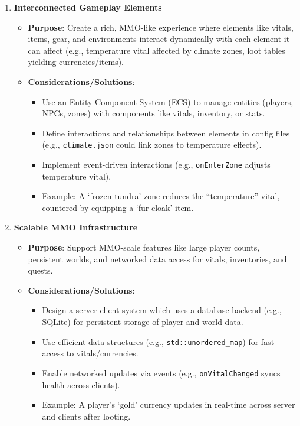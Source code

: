 \begin{enumerate}
    \item \textbf{Interconnected Gameplay Elements}
        \begin{itemize}
            \item \textbf{Purpose}: Create a rich, MMO-like experience where elements like vitals, items, gear, and environments interact dynamically with each element it can affect (e.g., temperature vital affected by climate zones, loot tables yielding currencies/items).
            \item \textbf{Considerations/Solutions}:
                \begin{itemize}
                    \item Use an Entity-Component-System (ECS) to manage entities (players, NPCs, zones) with components like vitals, inventory, or stats.
                    \item Define interactions and relationships between elements in config files (e.g., \texttt{climate.json} could link zones to temperature effects).
                    \item Implement event-driven interactions (e.g., \texttt{onEnterZone} adjusts temperature vital).
                    \item Example: A `frozen tundra' zone reduces the ``temperature'' vital, countered by equipping a `fur cloak' item.
                \end{itemize}
        \end{itemize}

    \item \textbf{Scalable MMO Infrastructure}
        \begin{itemize}
            \item \textbf{Purpose}: Support MMO-scale features like large player counts, persistent worlds, and networked data access for vitals, inventories, and quests.
            \item \textbf{Considerations/Solutions}:
                \begin{itemize}
                    \item Design a server-client system which uses a database backend (e.g., SQLite) for persistent storage of player and world data.
                    \item Use efficient data structures (e.g., \texttt{std::unordered\_map}) for fast access to vitals/currencies.
                    \item Enable networked updates via events (e.g., \texttt{onVitalChanged} syncs health across clients).
                    \item Example: A player’s `gold' currency updates in real-time across server and clients after looting.
                \end{itemize}
        \end{itemize}


\end{enumerate}
